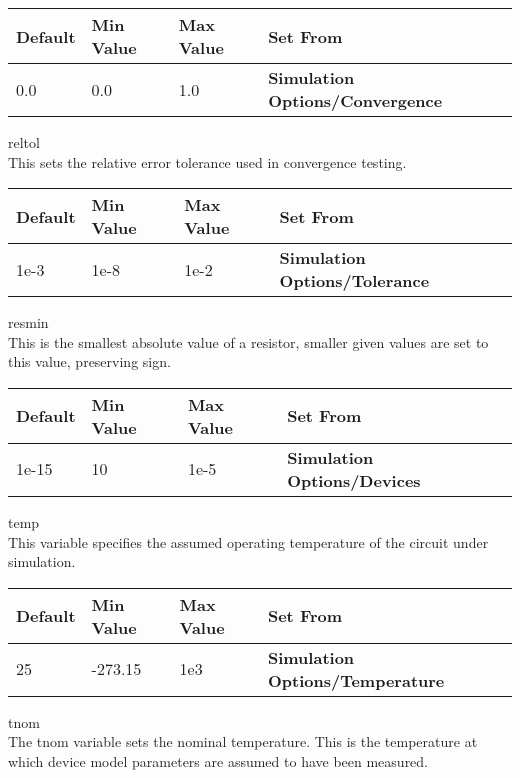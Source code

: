 \begin{description}
\begin{tabular}{|l|l|l|l|}\hline
\bf Default & \bf Min Value & \bf Max Value & \bf Set From\\ \hline
0.0 & 0.0 & 1.0 & \bf Simulation Options/Convergence\\ \hline
\end{tabular}

\item{\et reltol}\\
This sets the relative error tolerance used in convergence testing. 

\begin{tabular}{|l|l|l|l|}\hline
\bf Default & \bf Min Value & \bf Max Value & \bf Set From\\ \hline
1e-3 & 1e-8 & 1e-2 & \bf Simulation Options/Tolerance\\ \hline
\end{tabular}

\item{\et resmin}\\
This is the smallest absolute value of a resistor, smaller given
values are set to this value, preserving sign.

\begin{tabular}{|l|l|l|l|}\hline
\bf Default & \bf Min Value & \bf Max Value & \bf Set From\\ \hline
1e-15 & 10 & 1e-5 & \bf Simulation Options/Devices\\ \hline
\end{tabular}

\item{\et temp}\\
This variable specifies the assumed operating temperature of the
circuit under simulation.

\begin{tabular}{|l|l|l|l|}\hline
\bf Default & \bf Min Value & \bf Max Value & \bf Set From\\ \hline
25 & -273.15 & 1e3 & \bf Simulation Options/Temperature\\ \hline
\end{tabular}
 
\item{\et tnom}\\
The {\et tnom} variable sets the nominal temperature.  This is the
temperature at which device model parameters are assumed to have been
measured.


\end{description}
